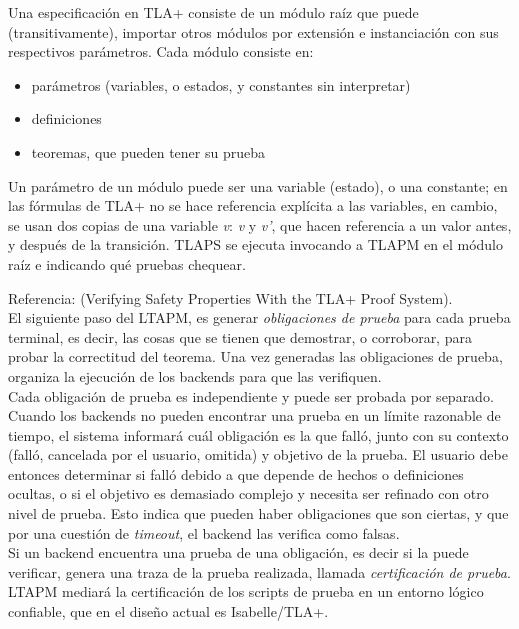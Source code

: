 \documentclass[spanish]{llncs}
\begin{document}
  Una especificación en TLA+ consiste de un módulo raíz que puede (transitivamente), importar otros módulos por extensión e instanciación con
  sus respectivos parámetros. Cada módulo consiste en:

  \begin{itemize}
   \item parámetros (variables, o estados, y constantes sin interpretar)
   \item definiciones
   \item teoremas, que pueden tener su prueba
  \end{itemize}

  Un parámetro de un módulo puede ser una variable (estado), o una constante; en las fórmulas de TLA+ no se hace referencia explícita a las variables, en cambio, se usan dos copias de una variable \textit{v}: \textit{v} y \textit{v'}, que hacen referencia a un valor antes, y después de la transición. 
  TLAPS se ejecuta invocando a TLAPM en el módulo raíz e indicando qué pruebas chequear. 

  Referencia: (Verifying Safety Properties With the TLA+ Proof System).
  \\
  
  El siguiente paso del LTAPM, es generar \textit{obligaciones de prueba} para cada prueba terminal, es decir, las cosas que se tienen que demostrar, o corroborar, para probar la correctitud del teorema. Una vez generadas las obligaciones de prueba, organiza la ejecución de los backends para que las verifiquen.
  \\
  
  Cada obligación de prueba es independiente y puede ser probada por separado. Cuando los backends no pueden encontrar una prueba en un límite razonable de tiempo, el sistema informará cuál obligación es la que falló, junto con su contexto (falló, cancelada por el usuario, omitida) y objetivo de la prueba.
  El usuario debe entonces determinar si falló debido a que depende de hechos o definiciones ocultas, o si el objetivo es demasiado complejo y necesita ser refinado con otro nivel de prueba. Esto indica que pueden haber obligaciones que son ciertas, y que por una cuestión de \textit{timeout},
  el backend las verifica como falsas.
  \\
  
  Si un backend encuentra una prueba de una obligación, es decir si la puede verificar, genera una traza de la prueba realizada, llamada \textit{certificación de prueba}. LTAPM  mediará la certificación de los scripts de prueba en un entorno lógico confiable, que en el diseño actual es Isabelle/TLA+.
  \\
  
\end{document}
